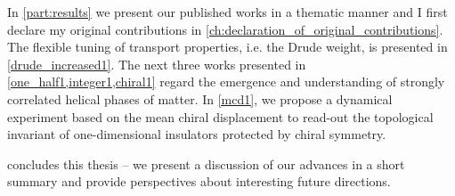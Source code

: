 In \cref{part:results} we present our published works in a thematic manner and I first declare my original contributions in \cref{ch:declaration_of_original_contributions}.
The flexible tuning of transport properties, i.e. the Drude weight, is presented in \cref{drude_increased1}.
The next three works presented in \cref{one_half1,integer1,chiral1} regard the emergence and understanding of strongly correlated helical phases of matter.
In \cref{mcd1}, we propose a dynamical experiment based on the mean chiral displacement to read-out the topological invariant of one-dimensional insulators protected by chiral symmetry.

 concludes this thesis -- we present a discussion of our advances in a short summary and provide perspectives about interesting future directions.
